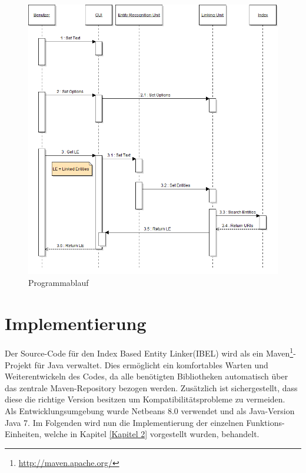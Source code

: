 \documentclass[11pt, a4paper, oneside]{Thesis} %
\begin{document}
\begin{figure}[ht!]
\centering
\includegraphics[scale=0.55]{./seq.png}
\caption[Programmablauf]{Programmablauf}
\end{figure}
\chapter{Implementierung}
\label{Kapitel 3}
Der Source-Code f\"ur den Index Based Entity Linker(IBEL) wird als ein  Maven\footnote{\url{http://maven.apache.org/}}-Projekt f\"ur Java verwaltet. Dies erm\"oglicht ein komfortables Warten und Weiterentwickeln des Codes, da alle ben\"otigten Bibliotheken automatisch \"uber das zentrale Maven-Repository bezogen werden. Zus\"atzlich ist sichergestellt, dass diese die richtige Version besitzen um Kompatibilitätsprobleme zu vermeiden.\\
Als Entwicklungsumgebung wurde Netbeans 8.0 verwendet und als Java-Version Java 7. 
Im Folgenden wird nun die Implementierung der einzelnen Funktions-Einheiten, welche in Kapitel \ref{Kapitel 2} vorgestellt wurden, behandelt.
\end{document}
